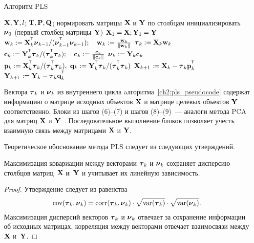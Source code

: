 \begin{algorithm}[h]
	\caption{Алгоритм PLS}
	\label{ch2:pls_pseudocode}
	\begin{algorithmic}[1]
		\REQUIRE $\mathbf{X}, \mathbf{Y}, l$;
		\ENSURE $\mathbf{T}, \mathbf{P}, \mathbf{Q}$;
		\STATE нормировать матрицы $\mathbf{X}$ и $\mathbf{Y}$ по столбцам
		\STATE инициализировать $\boldsymbol{\nu}_0$ (первый столбец матрицы $\mathbf{Y}$)
		\STATE $\mathbf{X}_1 = \mathbf{X}; \mathbf{Y}_1 = \mathbf{Y}$
		\REPEAT
		\vspace{0.1cm}
		\STATE $\bw_k := \bX_k^{\T} \bnu_{k-1} / (\bnu_{k-1}^{\T} \bnu_{k-1}); \quad \bw_k: = \frac{\bw_k}{\| \bw_k \|}$
		\vspace{0.1cm}
		\STATE $\boldsymbol{\tau}_k := \mathbf{X}_k \mathbf{w}_k$
		\vspace{0.1cm}
		\STATE $\bc_k := \bY_k^{\T} \btau_k / (\btau_k^{\T} \btau_k); \quad \bc_k: = \frac{\bc_k}{\| \bc_k \|}$
		\vspace{0.1cm}
		\STATE $\boldsymbol{\nu}_k := \mathbf{Y}_k \mathbf{c}_k$
		\vspace{0.1cm}
		\STATE $\bp_k:= \bX_k^{\T}\btau_k/(\btau_k^{\T}\btau_k),\ 
		\bq_k := \bY_k^{\T}\btau_k/(\btau_k^{\T}\btau_k)$
		\vspace{0.2cm}
		\STATE $\bX_{k+1} :=  \bX_k - \btau_k \bp_k^{\T}$
		\vspace{0.2cm}
		\STATE $\bY_{k + 1} :=  \bY_k - \btau_k \bq_k^{\T}$ 
		\ENDFOR
	\end{algorithmic}
\end{algorithm}

Вектора $\boldsymbol{\tau}_k$ и $\boldsymbol{\nu}_k$ из внутреннего цикла aлгоритма~\ref{ch2:pls_pseudocode}
содержат информацию о матрице исходных объектов $\mathbf{X}$ и матрице целевых объектов $\mathbf{Y}$ соответственно. 
Блоки из шагов (6)--(7) и шагов (8)--(9)~--- аналоги метода PCA для матриц $\mathbf{X}$ и $\mathbf{Y}$~\cite{geladi1988pls}. 
Последовательное выполнение блоков позволяет учесть взаимную связь между матрицами $\mathbf{X}$ и $\mathbf{Y}$.

Теоретическое обоснование метода PLS следует из следующих утверждений.
\begin{statement}
	Максимизация ковариации между векторами $\boldsymbol{\tau}_k$ и $\boldsymbol{\nu}_k$ сохраняет дисперсию столбцов матриц~$\mathbf{X}$ и~$\mathbf{Y}$ и учитывает их линейную зависимость.
\end{statement}
\begin{proof}
	Утверждение следует из равенства
	\[
	\text{cov} (\boldsymbol{\tau}_k, \boldsymbol{\nu}_k) = \text{corr} (\boldsymbol{\tau}_k, \boldsymbol{\nu}_k) \cdot \sqrt{\text{var}(\boldsymbol{\tau}_k)} \cdot \sqrt{\text{var}(\boldsymbol{\nu}_k)}.
	\]
	Максимизация дисперсий векторов $\boldsymbol{\tau}_k$ и $\boldsymbol{\nu}_k$ отвечает за сохранение информации об исходных матрицах, корреляция между векторами отвечает взаимосвязи между $\mathbf{X}$ и~$\mathbf{Y}$. 
\end{proof}

